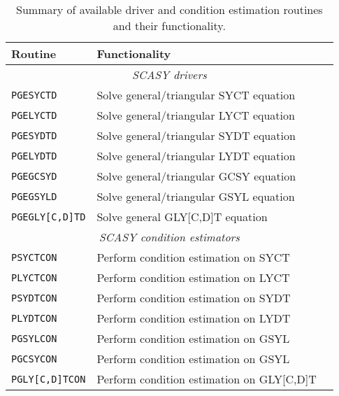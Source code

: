 \documentclass[11pt]{article}
\begin{document}
\begin{table}
\centering \small
\begin{tabular}{|l|ll|} \hline
  {\rm {\bf Routine}} & {\rm {\bf Functionality}} & \\ \hline
  \multicolumn{3}{|c|}{\em SCASY drivers} \\ \hline
  {\tt PGESYCTD} & Solve general/triangular SYCT equation & \\
  {\tt PGELYCTD} & Solve general/triangular LYCT equation  & \\
  {\tt PGESYDTD} & Solve general/triangular SYDT equation & \\
  {\tt PGELYDTD} & Solve general/triangular LYDT equation & \\
  {\tt PGEGCSYD} & Solve general/triangular GCSY equation & \\
  {\tt PGEGSYLD} & Solve general/triangular GSYL equation & \\
  {\tt PGEGLY[C,D]TD} & Solve general GLY[C,D]T equation & \\ \hline
  \multicolumn{3}{|c|}{\em SCASY condition estimators} \\ \hline
  {\tt PSYCTCON} & Perform condition estimation on SYCT & \\
  {\tt PLYCTCON} & Perform condition estimation on LYCT & \\
  {\tt PSYDTCON} & Perform condition estimation on SYDT & \\
  {\tt PLYDTCON} & Perform condition estimation on LYDT & \\
  {\tt PGSYLCON} & Perform condition estimation on GSYL & \\
  {\tt PGCSYCON} & Perform condition estimation on GSYL & \\
  {\tt PGLY[C,D]TCON} & Perform condition estimation on GLY[C,D]T & \\ \hline
\end{tabular}
\caption{Summary of available driver and condition estimation
routines and their functionality.} \label{tab:routines}
\end{table}
\end{document}
